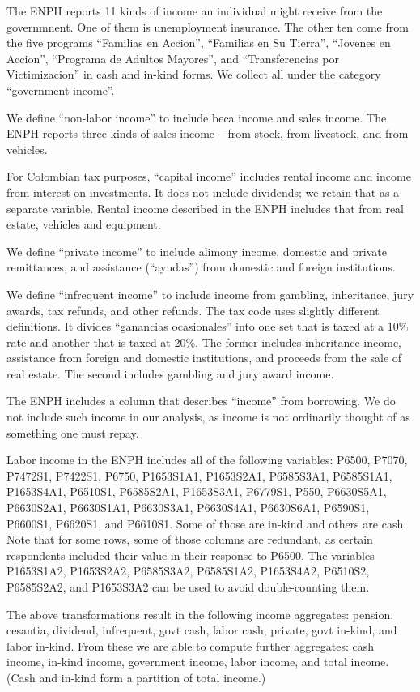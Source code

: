 \documentclass[12pt]{article}
\begin{document}
\begin{appendices}
The ENPH reports 11 kinds of income
an individual might receive from the governmnent.
One of them is unemployment insurance.
The other ten come from the five programs
``Familias en Accion'',
``Familias en Su Tierra'',
``Jovenes en Accion'',
``Programa de Adultos Mayores'', and
``Transferencias por Victimizacion''
in cash and in-kind forms.
We collect all under the category ``government income''.

We define ``non-labor income'' to include beca income and sales income.
The ENPH reports three kinds of sales income --
from stock, from livestock, and from vehicles.

For Colombian tax purposes, ``capital income''
includes rental income and income from interest on investments.
It does not include dividends; we retain that as a separate variable.
Rental income described in the ENPH includes that from
real estate, vehicles and equipment.

We define ``private income'' to include
alimony income, domestic and private remittances, and
assistance (``ayudas'') from domestic and foreign institutions.

We define ``infrequent income'' to include income from
gambling, inheritance, jury awards, tax refunds, and other refunds.
The tax code uses slightly different definitions.
It divides ``ganancias ocasionales'' into
one set that is taxed at a 10\% rate
and another that is taxed at 20\%.
The former includes inheritance income,
assistance from foreign and domestic institutions,
and proceeds from the sale of real estate.
The second includes gambling and jury award income.

The ENPH includes a column that describes ``income'' from borrowing.
We do not include such income in our analysis,
as income is not ordinarily thought of as something one must repay.

Labor income in the ENPH includes all of the following variables:
P6500,
P7070,
P7472S1,
P7422S1,
P6750,
P1653S1A1,
P1653S2A1,
P6585S3A1,
P6585S1A1,
P1653S4A1,
P6510S1,
P6585S2A1,
P1653S3A1,
P6779S1,
P550,
P6630S5A1,
P6630S2A1,
P6630S1A1,
P6630S3A1,
P6630S4A1,
P6630S6A1,
P6590S1,
P6600S1,
P6620S1,
and P6610S1.
Some of those are in-kind and others are cash.
Note that for some rows, some of those columns are redundant,
as certain respondents included their value in their response to P6500.
The variables
P1653S1A2,
P1653S2A2,
P6585S3A2,
P6585S1A2,
P1653S4A2,
P6510S2,
P6585S2A2,
and P1653S3A2 can be used to avoid double-counting them.

The above transformations result in the following income aggregates:
pension,
cesantia,
dividend,
infrequent,
govt cash,
labor cash,
private,
govt in-kind,
and labor in-kind.
From these we are able to compute further aggregates:
cash income,
in-kind income,
government income,
labor income,
and total income.
(Cash and in-kind form a partition of total income.)


\end{appendices}
\end{document}
